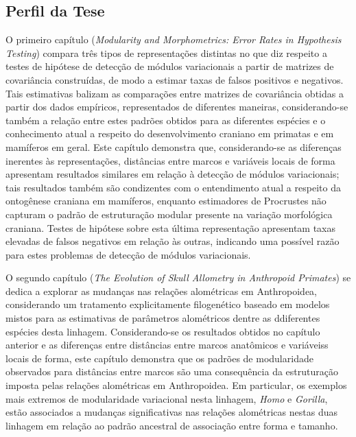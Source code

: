 \documentclass[12pt,twoside]{report}
\begin{document}
\newpage

\subsection{Perfil da Tese}\label{perfil-da-tese}

O primeiro capítulo (\emph{Modularity and Morphometrics: Error Rates in
Hypothesis Testing}) compara três tipos de representações distintas no
que diz respeito a testes de hipótese de detecção de módulos
variacionais a partir de matrizes de covariância construídas, de modo a
estimar taxas de falsos positivos e negativos. Tais estimativas balizam
as comparações entre matrizes de covariância obtidas a partir dos dados
empíricos, representados de diferentes maneiras, considerando-se também
a relação entre estes padrões obtidos para as diferentes espécies e o
conhecimento atual a respeito do desenvolvimento craniano em primatas e
em mamíferos em geral. Este capítulo demonstra que, considerando-se as
diferenças inerentes às representações, distâncias entre marcos e
variáveis locais de forma apresentam resultados similares em relação à
detecção de módulos variacionais; tais resultados também são condizentes
com o entendimento atual a respeito da ontogênese craniana em mamíferos,
enquanto estimadores de Procrustes não capturam o padrão de estruturação
modular presente na variação morfológica craniana. Testes de hipótese
sobre esta última representação apresentam taxas elevadas de falsos
negativos em relação às outras, indicando uma possível razão para estes
problemas de detecção de módulos variacionais.

O segundo capítulo (\emph{The Evolution of Skull Allometry in Anthropoid
Primates}) se dedica a explorar as mudanças nas relações alométricas em
Anthropoidea, considerando um tratamento explicitamente filogenético
baseado em modelos mistos para as estimativas de parâmetros alométricos
dentre as ddiferentes espécies desta linhagem. Considerando-se os
resultados obtidos no capítulo anterior e as diferenças entre distâncias
entre marcos anatômicos e variáveiss locais de forma, este capítulo
demonstra que os padrões de modularidade observados para distâncias
entre marcos são uma consequência da estruturação imposta pelas relações
alométricas em Anthropoidea. Em particular, os exemplos mais extremos de
modularidade variacional nesta linhagem, \emph{Homo} e \emph{Gorilla},
estão associados a mudanças significativas nas relações alométricas
nestas duas linhagem em relação ao padrão ancestral de associação entre
forma e tamanho.
\end{document}
